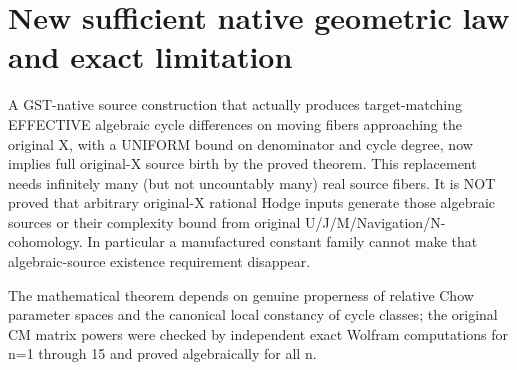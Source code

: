 \documentclass{article}
\begin{document}
\section{New sufficient native geometric law and exact limitation}
A GST-native source construction that actually produces target-matching EFFECTIVE algebraic cycle differences on moving fibers approaching the original X, with a UNIFORM bound on denominator and cycle degree, now implies full original-X source birth by the proved theorem.
This replacement needs infinitely many (but not uncountably many) real source fibers.
It is NOT proved that arbitrary original-X rational Hodge inputs generate those algebraic sources or their complexity bound from original U/J/M/Navigation/N-cohomology.
In particular a manufactured constant family cannot make that algebraic-source existence requirement disappear.

The mathematical theorem depends on genuine properness of relative Chow parameter spaces and the canonical local constancy of cycle classes; the original CM matrix powers were checked by independent exact Wolfram computations for n=1 through 15 and proved algebraically for all n.
\end{document}
